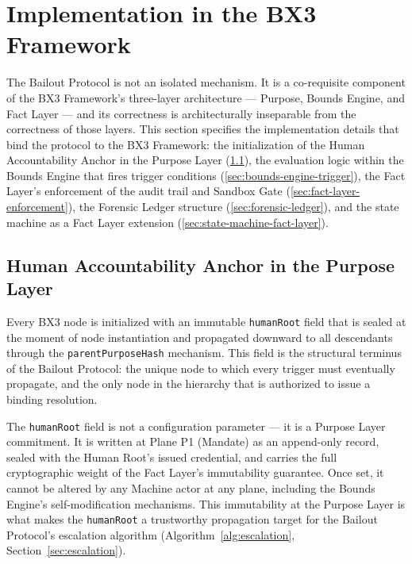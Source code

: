 
\section{Implementation in the BX3 Framework}
\label{sec:bailout-implementation}

The Bailout Protocol is not an isolated mechanism. It is a co-requisite component of the BX3 Framework's three-layer architecture --- Purpose, Bounds Engine, and Fact Layer --- and its correctness is architecturally inseparable from the correctness of those layers. This section specifies the implementation details that bind the protocol to the BX3 Framework: the initialization of the Human Accountability Anchor in the Purpose Layer (\ref{sec:human-anchor-purpose}), the evaluation logic within the Bounds Engine that fires trigger conditions (\ref{sec:bounds-engine-trigger}), the Fact Layer's enforcement of the audit trail and Sandbox Gate (\ref{sec:fact-layer-enforcement}), the Forensic Ledger structure (\ref{sec:forensic-ledger}), and the state machine as a Fact Layer extension (\ref{sec:state-machine-fact-layer}).

\subsection{Human Accountability Anchor in the Purpose Layer}
\label{sec:human-anchor-purpose}

Every BX3 node is initialized with an immutable \texttt{humanRoot} field that is sealed at the moment of node instantiation and propagated downward to all descendants through the \texttt{parentPurposeHash} mechanism. This field is the structural terminus of the Bailout Protocol: the unique node to which every trigger must eventually propagate, and the only node in the hierarchy that is authorized to issue a binding resolution.

The \texttt{humanRoot} field is not a configuration parameter --- it is a Purpose Layer commitment. It is written at Plane P1 (Mandate) as an append-only record, sealed with the Human Root's issued credential, and carries the full cryptographic weight of the Fact Layer's immutability guarantee. Once set, it cannot be altered by any Machine actor at any plane, including the Bounds Engine's self-modification mechanisms. This immutability at the Purpose Layer is what makes the \texttt{humanRoot} a trustworthy propagation target for the Bailout Protocol's escalation algorithm (Algorithm~\ref{alg:escalation}, Section~\ref{sec:escalation}).

